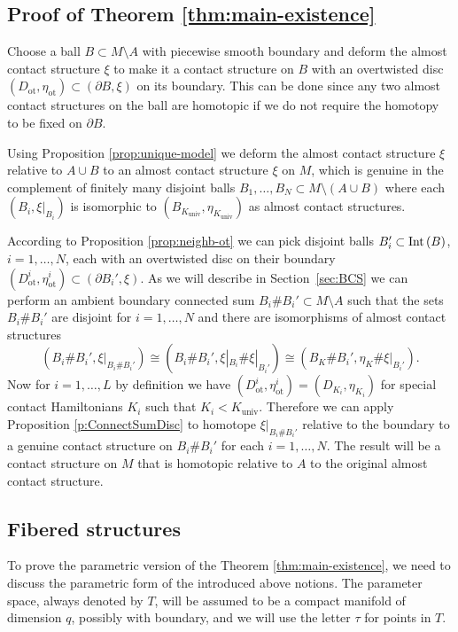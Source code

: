 \documentclass[12pt]{paper}
\theoremstyle{plain}
\theoremstyle{definition}
\newcommand{\p}{\partial}
\newcommand{\Int}{{\rm Int\,}} %
\newcommand{\univ}{\mathrm{univ}}
\newcommand{\ot}{\mathrm{ot}}
\numberwithin{figure}{section}
\begin{document}
	

\subsection{Proof of Theorem \ref{thm:main-existence}}\label{sec:proof-existence}
 
Choose a ball $B\subset M\setminus A$ with piecewise smooth boundary and deform the almost contact structure $\xi$ to make it a contact structure on $B$ with an overtwisted disc $(D_\ot, \eta_{\ot}) \subset (\p B, \xi)$ on its boundary.
This can be done since any two almost contact structures on the ball are homotopic if
we do not require the homotopy to be fixed on $\p B$.

 Using Proposition \ref{prop:unique-model} we deform the almost  contact  structure $\xi$  relative to $A\cup B$ to an almost contact structure $\xi$ on $M$, which is genuine in the complement of finitely many disjoint balls
$B_1,\dots, B_N\subset M\setminus (A\cup B)$ where each $(B_i, \xi|_{B_i})$ is isomorphic to $(B_{K_\univ}, \eta_{K_\univ})$
as almost contact structures.
    
    According to Proposition \ref{prop:neighb-ot} we can pick disjoint balls $B_i' \subset \Int(B)$, $i=1,\dots, N$, each with an overtwisted disc on their boundary $(D^i_{\ot}, \eta_{\ot}^i) \subset (\p B_i', \xi)$.
As we will describe in Section~\ref{sec:BCS} we can perform
    an ambient boundary connected sum $B_i \# B_i' \subset M \setminus A$ such that the sets $B_i \# B_i'$ are disjoint for $i=1, \dots, N$ and there are isomorphisms of almost contact structures
    $$
    	(B_i \# B_i', \xi|_{B_i \# B_i'}) \cong (B_i \# B_i', \xi|_{B_i} \# \xi|_{B_i'}) \cong (B_K \# B_i', \eta_K \# \xi|_{B_i'}).
    $$
Now for $i=1, \dots, L$ by definition we have $(D^i_{\ot}, \eta_{\ot}^i) = (D_{K_i}, \eta_{K_i})$ for
special contact Hamiltonians $K_i$ such that $K_i < K_\univ$.  Therefore we can
apply Proposition \ref{p:ConnectSumDisc} to homotope $\xi|_{B_i \# B_i'}$ relative to the boundary to a genuine contact structure on $B_i \# B_i'$ for each $i=1,\dots, N$.  The result will be a contact structure on $M$ that is homotopic relative to $A$ to the original almost contact structure.
 

 

 
 
  \subsection{Fibered structures}
  To prove the parametric version of the Theorem  \ref{thm:main-existence},
  we need to discuss  the  parametric form of the introduced above notions.  The parameter space, always denoted by $T$, will be assumed to be a compact manifold of dimension $q$, possibly with boundary, and 
  we will use the letter $\tau$ for points in $T$.
\end{document}
